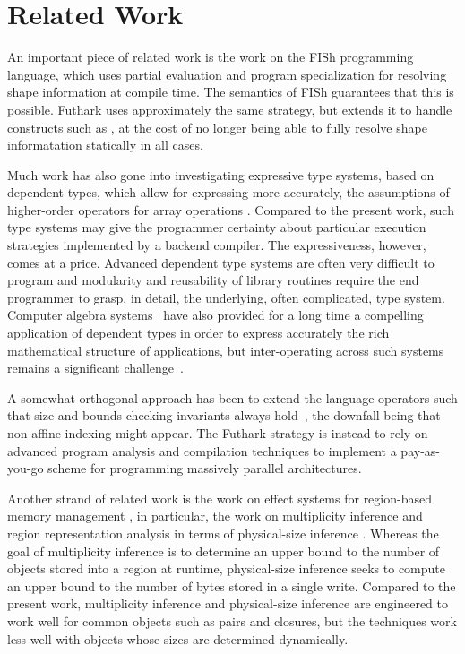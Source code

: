 \section{Related Work}

An important piece of related work is the work on the FISh \cite{fish}
programming language, which uses partial evaluation and program
specialization for resolving shape information at compile time.  The
semantics of FISh guarantees that this is possible.  Futhark uses
approximately the same strategy, but extends it to handle constructs
such as , at the cost of no longer being able to fully
resolve shape informatation statically in all cases.

Much work has also gone into investigating expressive type systems,
based on dependent types, which allow for expressing more accurately,
the assumptions of higher-order operators for array operations
\cite{AgdaAccellerate,Trojahner:2008,Trojahner2009643}. Compared to
the present work, such type systems may give the programmer certainty
about particular execution strategies implemented by a backend
compiler. The expressiveness, however, comes at a price. Advanced
dependent type systems are often very difficult to program and
modularity and reusability of library routines require the end
programmer to grasp, in detail, the underlying, often complicated,
type system.  Computer algebra systems~\cite{AXIOM,AldorCAH} have also
provided for a long time a compelling application of dependent types
in order to express accurately the rich mathematical structure of
applications, but inter-operating across such systems remains a
significant challenge~\cite{mapal_synasc,alma:ISSAC}.

A somewhat orthogonal approach has been to extend the language
operators such that size and bounds checking invariants always
hold~\cite{ElsmanDybdal:Array:2014}, the downfall being that
non-affine indexing might appear.  The Futhark strategy is instead to
rely on advanced program analysis and compilation techniques to
implement a pay-as-you-go scheme for programming massively parallel
architectures.

Another strand of related work is the work on effect systems for
region-based memory management \cite{mlkit_retrospective}, in
particular, the work on multiplicity inference and region
representation analysis in terms of physical-size inference
\cite{vejlstrup94,btv96}. Whereas the goal of multiplicity inference
is to determine an upper bound to the number of objects stored into a
region at runtime, physical-size inference seeks to compute an upper
bound to the number of bytes stored in a single write. Compared to the
present work, multiplicity inference and physical-size inference are
engineered to work well for common objects such as pairs and closures,
but the techniques work less well with objects whose sizes are
determined dynamically.

